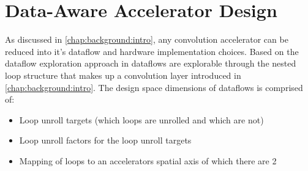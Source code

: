 \chapter{Data-Aware Accelerator Design}
\label{chap:dda}

As discussed in \autoref{chap:background:intro}, any convolution accelerator can
be reduced into it's dataflow and hardware implementation choices. Based on the
dataflow exploration approach in \cite{dnn_df_overrated_v1} dataflows are
explorable through the nested loop structure that makes up a convolution
layer introduced in \autoref{chap:background:intro}.
The design space dimensions of dataflows is comprised of:
\begin{itemize}
    \item Loop unroll targets (which loops are unrolled and which are not) 
    \item Loop unroll factors for the loop unroll targets
    \item Mapping of loops to an accelerators spatial axis of which there are 2
\end{itemize}

